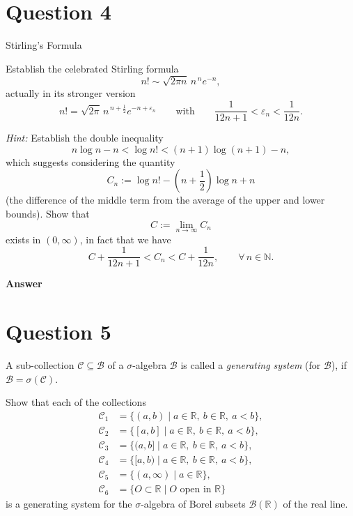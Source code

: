 \documentclass[letterpaper]{article}
\begin{document}
		\clearpage
		
		\section{Question 4}
		{\color{deepred} Stirling's Formula}
		
			Establish the celebrated Stirling formula
			\[
			n! \sim \sqrt{2\pi n}\, n^{\,n} e^{-n},
			\]
			actually in its stronger version
			\begin{equation}
				n! = \sqrt{2\pi}\, n^{\,n+\frac12} e^{-n+\varepsilon_n}
				\qquad \text{with} \qquad
				\frac{1}{12n+1} < \varepsilon_n < \frac{1}{12n}.
				\tag{0.1}
			\end{equation}
			
			\emph{Hint:} Establish the double inequality
			\[
			n \log n - n < \log n! < (n+1)\log(n+1) - n,
			\]
			which suggests considering the quantity
			\[
			C_n := \log n! - \left(n+\frac12\right)\log n + n
			\]
			(the difference of the middle term from the average of the upper and lower bounds).
			Show that
			\[
			C := \lim_{n\to\infty} C_n
			\]
			exists in $(0,\infty)$, in fact that we have
			\[
			C + \frac{1}{12n+1} < C_n < C + \frac{1}{12n},
			\qquad \forall\, n \in \mathbb{N}.
			\]

		
		\textbf{Answer}
		
		\clearpage
		
		\section{Question 5}
		
		A sub-collection $\mathcal{C} \subseteq \mathcal{B}$ of a $\sigma$-algebra
		$\mathcal{B}$ is called a \emph{generating system} (for $\mathcal{B}$), if
		$\mathcal{B} = \sigma(\mathcal{C})$.
		
		Show that each of the collections
		\[
		\begin{aligned}
			\mathcal{C}_1 &= \{ (a,b) \mid a \in \mathbb{R},\ b \in \mathbb{R},\ a<b \}, \\
			\mathcal{C}_2 &= \{ [a,b] \mid a \in \mathbb{R},\ b \in \mathbb{R},\ a<b \}, \\
			\mathcal{C}_3 &= \{ (a,b] \mid a \in \mathbb{R},\ b \in \mathbb{R},\ a<b \}, \\
			\mathcal{C}_4 &= \{ [a,b) \mid a \in \mathbb{R},\ b \in \mathbb{R},\ a<b \}, \\
			\mathcal{C}_5 &= \{ (a,\infty) \mid a \in \mathbb{R} \}, \\
			\mathcal{C}_6 &= \{ O \subset \mathbb{R} \mid O \text{ open in } \mathbb{R} \}
		\end{aligned}
		\]
		is a generating system for the $\sigma$-algebra of Borel subsets
		$\mathcal{B}(\mathbb{R})$ of the real line.
		
\end{document}
